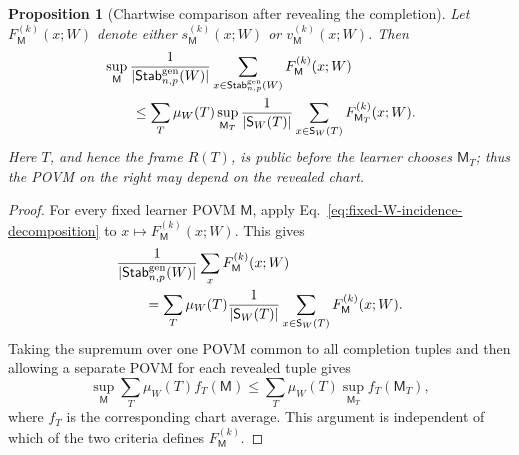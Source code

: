 \documentclass[11pt]{article}
\newcommand{\1}{\mathbf 1}
\theoremstyle{plain}
\newtheorem{proposition}[theorem]{Proposition}
\theoremstyle{definition}
\theoremstyle{remark}
\begin{document}
\begin{proposition}[Chartwise comparison after revealing the completion]
\label{prop:chartwise-comparison-after-revelation}
Let $F_{\mathsf M}^{(k)}(x;W)$ denote either
$s_{\mathsf M}^{(k)}(x;W)$ or $v_{\mathsf M}^{(k)}(x;W)$. Then
\begin{align}
&\sup_{\mathsf M}
\frac1{|\mathsf{Stab}_{n,p}^{\mathrm{gen}}(W)|}
\sum_{x\in\mathsf{Stab}_{n,p}^{\mathrm{gen}}(W)}F_{\mathsf M}^{(k)}(x;W)
\notag\\
&\qquad\le
\sum_T\mu_W(T)\sup_{\mathsf M_T}
\frac1{|\mathsf S_W(T)|}
\sum_{x\in\mathsf S_W(T)}F_{\mathsf M_T}^{(k)}(x;W).
\label{eq:common-chartwise-revelation-comparison}
\end{align}
Here $T$, and hence the frame $R(T)$, is public before the learner chooses
$\mathsf M_T$; thus the POVM on the right may depend on the revealed chart.
\end{proposition}

\begin{proof}
For every fixed learner POVM $\mathsf M$, apply
Eq.~\eqref{eq:fixed-W-incidence-decomposition} to
$x\mapsto F_{\mathsf M}^{(k)}(x;W)$. This gives
\begin{align}
&\frac1{|\mathsf{Stab}_{n,p}^{\mathrm{gen}}(W)|}
\sum_xF_{\mathsf M}^{(k)}(x;W)
\notag\\
&\qquad=
\sum_T\mu_W(T)\frac1{|\mathsf S_W(T)|}
\sum_{x\in\mathsf S_W(T)}F_{\mathsf M}^{(k)}(x;W).
\label{eq:common-chartwise-revelation-fixed-POVM}
\end{align}
Taking the supremum over one POVM common to all completion tuples and then
allowing a separate POVM for each revealed tuple gives
\begin{equation}
\sup_{\mathsf M}\sum_T\mu_W(T)f_T(\mathsf M)
\le\sum_T\mu_W(T)\sup_{\mathsf M_T}f_T(\mathsf M_T),
\label{eq:supremum-inside-incidence-mixture}
\end{equation}
where $f_T$ is the corresponding chart average. This argument is independent
of which of the two criteria defines $F_{\mathsf M}^{(k)}$.
\end{proof}
\end{document}
